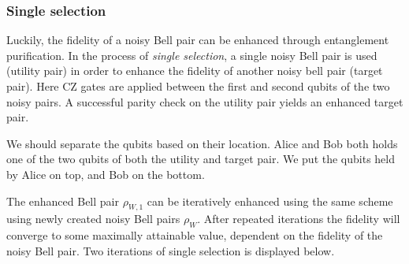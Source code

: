 \subsubsection*{Single selection}
Luckily, the fidelity of a noisy Bell pair can be enhanced through entanglement purification. In the process of \emph{single selection}, a single noisy Bell pair is used (utility pair) in order to enhance the fidelity of another noisy bell pair (target pair). Here CZ gates are applied between the first and second qubits of the two noisy pairs. A successful parity check on the utility pair yields an enhanced target pair.
\begin{center}
\end{center}

We should separate the qubits based on their location. Alice and Bob both holds one of the two qubits of both the utility and target pair. We put the qubits held by Alice on top, and Bob on the bottom.

\begin{center}
\end{center}

The enhanced Bell pair $\rho_{W,1}$ can be iteratively enhanced using the same scheme using newly created noisy Bell pairs $\rho_W$. After repeated iterations the fidelity will converge to some maximally attainable value, dependent on the fidelity of the noisy Bell pair. Two iterations of single selection is displayed below.

